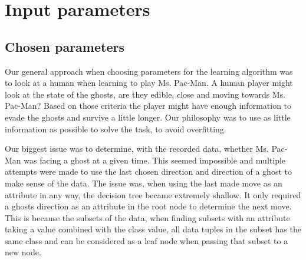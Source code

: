 \documentclass{article}
\begin{document}
\fi %
\section{Input parameters}
\iffalse  %
The Ms. Pac-Man implementation that we were given contained some parameters to choose from. For example there are four ghosts on the playing field. Each of the ghosts has attributes like:

\begin{itemize}
     \setlength\itemsep{0em}
    \item Distance (from the ghosts to Ms. Pac-Man)
    \item Direction (in which direction are the ghosts moving in)
    \item Edible (are the ghosts edible)
\end{itemize}

Other parameters that is not concerning the ghosts but still can be used are:

\begin{itemize}
    \setlength\itemsep{0em}
    \item Number of pills left
    \item Number of big pills left
    \item Current game time
    \item Current score
    \item Number of lives left
    \item Ms. Pac-Mans position
    \item Last chosen direction
\end{itemize}
\fi %

    \subsection{Chosen parameters}
    Our general approach when choosing parameters for the learning algorithm was to look at a human when learning to play Ms. Pac-Man. A human player might look at the state of the ghosts, are they edible, close and moving towards Ms. Pac-Man? Based on those criteria the player might have enough information to evade the ghosts and survive a little longer. Our philosophy was to use as little information as possible to solve the task, to avoid overfitting.

    Our biggest issue was to determine, with the recorded data, whether Ms. Pac-Man was facing a ghost at a given time. This seemed impossible and multiple attempts were made to use the last chosen direction and direction of a ghost to make sense of the data. The issue was, when using the last made move as an attribute in any way, the decision tree became extremely shallow. It only required a ghosts direction as an attribute in the root node to determine the next move. This is because the subsets of the data, when finding subsets with an attribute taking a value combined with the class value, all data tuples in the subset has the same class and can be considered as a leaf node when passing that subset to a new node.
\end{document}
